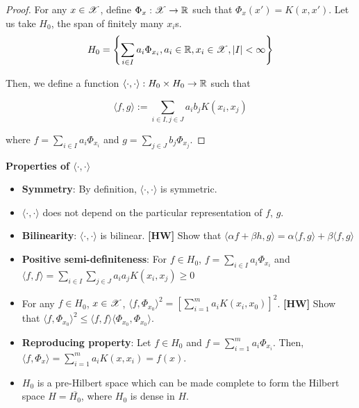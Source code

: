\documentclass[a4paper,english,12pt]{article}
\begin{document}
\begin{proof}
	For any $x \in \mathscr{X}$, define $\Phi_x:\mathscr{X}\rightarrow\mathbb{R}$ such that $\Phi_x(x') = K(x,x')$.
	Let us take $H_0$, the span of finitely many $x_i$s.
	\[H_0 = \left\lbrace \sum_{i \in I}a_i \Phi_{x_i}, a_i \in \mathbb{R}, x_i \in \mathscr{X}, |I| < \infty\right\rbrace\]
	
	Then, we define a function $\langle \cdot, \cdot \rangle: H_0 \times H_0 \rightarrow \mathbb{R}$ such that
	
	\[\langle f, g \rangle := \sum_{i \in I, j \in J} a_i b_j K(x_i, x_j)\]
	
	where $f = \sum_{i \in I} a_i \Phi_{x_i}$ and $g = \sum_{j \in J} b_j \Phi_{x_j}$.
\end{proof}

\begin{rem} \textbf{Properties of $\langle \cdot, \cdot \rangle$}
\begin{itemize}
		\item \textbf{Symmetry}: By definition, $\langle \cdot, \cdot \rangle$ is symmetric.
		\item $\langle \cdot, \cdot \rangle$ does not depend on the particular representation of $f$, $g$.
		\item \textbf{Bilinearity}: $\langle \cdot, \cdot \rangle$ is bilinear. \textbf{[HW]} Show that $\langle \alpha f + \beta h, g \rangle = \alpha \langle f, g \rangle + \beta \langle f, g \rangle$
		\item \textbf{Positive semi-definiteness}: For $f \in H_0$, $f = \sum_{i \in I} a_i \Phi_{x_i}$ and $\langle f, f \rangle = \sum_{i \in I} \sum_{j \in J} a_i a_j K(x_i,x_j) \ge 0$
		\item For any $f \in H_0$, $x \in \mathscr{X}$, $\langle f, \Phi_{x_0} \rangle^2 = \left[\sum_{i=1}^m a_i K(x_i, x_0)\right]^2$. \textbf{[HW]} Show that $\langle f, \Phi_{x_0} \rangle^2 \le \langle f, f \rangle \langle \Phi_{x_0}, \Phi_{x_0} \rangle$.
		\item \textbf{Reproducing property}: Let $f \in H_0$ and $f = \sum_{i=1}^m a_i \Phi_{x_i}$. Then, $\langle f, \Phi_x \rangle = \sum_{i=1}^m a_i K(x, x_i) = f(x)$.
		\item $H_0$ is a pre-Hilbert space which can be made complete to form the Hilbert space $H = \overline{H_0}$, where $H_0$ is dense in $H$. 
\end{itemize}
\end{rem}
\end{document}
